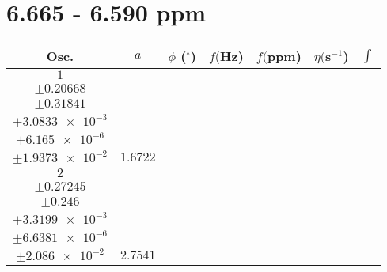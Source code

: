 \documentclass[8pt]{article}
\begin{document}
\section*{6.665 - 6.590 ppm}
\begin{longtable}[l]{c c c c c c c}
\toprule
Osc. & $a$ & $\phi$ ($^{\circ}$) & $f ($Hz) & $f ($ppm) & $\eta ($s$^{-1}$) & $\int$\\
\midrule
$\num{1}$ & \begin{tabular}[c]{@{}c@{}}$\num{37.191}$ \\ $\pm\num{0.20668}$\end{tabular} & \begin{tabular}[c]{@{}c@{}}$\num{2.0261}$ \\ $\pm\num{0.31841}$\end{tabular} & \begin{tabular}[c]{@{}c@{}}$\num{3.3073e+3}$ \\ $\pm\num{3.0833e-3}$\end{tabular} & \begin{tabular}[c]{@{}c@{}}$\num{6.6128}$ \\ $\pm\num{6.165e-6}$\end{tabular} & \begin{tabular}[c]{@{}c@{}}$\num{4.8784}$ \\ $\pm\num{1.9373e-2}$\end{tabular} & $\num{1.6722}$\\
$\num{2}$ & \begin{tabular}[c]{@{}c@{}}$\num{63.456}$ \\ $\pm\num{0.27245}$\end{tabular} & \begin{tabular}[c]{@{}c@{}}$\num{1.9139}$ \\ $\pm\num{0.246}$\end{tabular} & \begin{tabular}[c]{@{}c@{}}$\num{3.309e+3}$ \\ $\pm\num{3.3199e-3}$\end{tabular} & \begin{tabular}[c]{@{}c@{}}$\num{6.6162}$ \\ $\pm\num{6.6381e-6}$\end{tabular} & \begin{tabular}[c]{@{}c@{}}$\num{6.6805}$ \\ $\pm\num{2.086e-2}$\end{tabular} & $\num{2.7541}$\\

\end{longtable}
\end{document}
